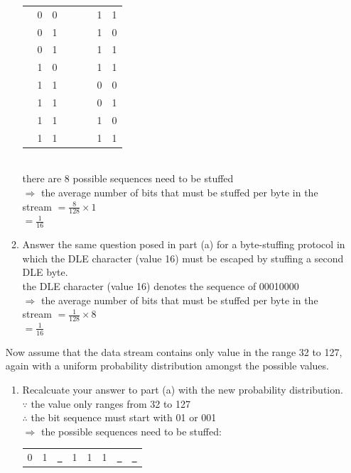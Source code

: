 \documentclass[10pt, a4paper]{article}
\begin{document}
\begin{enumerate}
\begin{enumerate}
\begin{tabular}{cccccccc}
              & 0 & 0 & & & & 1 & 1\\
              & 0 & 1 & & & & 1 & 0\\
              & 0 & 1 & & & & 1 & 1\\
              & 1 & 0 & & & & 1 & 1\\
              & 1 & 1 & & & & 0 & 0\\
              & 1 & 1 & & & & 0 & 1\\
              & 1 & 1 & & & & 1 & 0\\
              & 1 & 1 & & & & 1 & 1\\
        \end{tabular}\\
        there are 8 possible sequences need to be stuffed\\
        $\Rightarrow$ the average number of bits that must be stuffed per byte in the stream $= \frac{8}{128} \times 1$\\
        $= \frac{1}{16}$
        \color{black}
    \item Answer the same question posed in part (a) for a byte-stuffing protocol in which the DLE character (value 16) must be escaped by stuffing a second DLE byte.\\
        \color{blue}
        the DLE character (value 16) denotes the sequence of 00010000\\
        $\Rightarrow$ the average number of bits that must be stuffed per byte in the stream $= \frac{1}{128} \times 8$\\
        $= \frac{1}{16}$
        \color{black}
    \end{enumerate}
    Now assume that the data stream contains only value in the range 32 to 127, again with a uniform probability distribution amongst the possible values.
    \begin{enumerate}
    \item Recalcuate your answer to part (a) with the new probability distribution.\\
        \color{blue}
        $\because$ the value only ranges from 32 to 127\\
        $\therefore$ the bit sequence must start with 01 or 001\\
        $\Rightarrow$ the possible sequences need to be stuffed:\\
        \begin{tabular}[t]{cccccccc}
            0 & 1 & \underline{\ } & 1 & 1 & 1 & \underline{\ } & \underline{\ }\\

\end{tabular}
\end{enumerate}
\end{enumerate}
\end{document}
